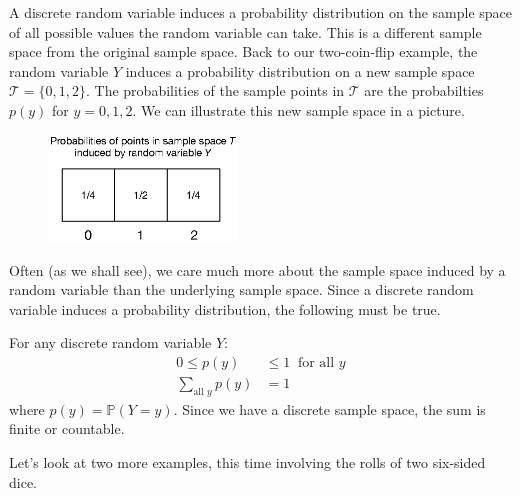 \documentclass[12pt]{article}
\theoremstyle{definition}
\theoremstyle{remark}
\def\P{{\mathbb P}}
\begin{document}
A discrete random variable induces a probability distribution on the sample space of all possible values the random variable can take. This is a different sample space from the original sample space. Back to our two-coin-flip example, the random variable $Y$ induces a probability distribution on a new sample space $\mathcal{T} = \{0, 1, 2\}$. The probabilities of the sample points in $\mathcal{T}$ are the probabilties $p(y)$ for $y = 0, 1, 2$. We can illustrate this new sample space in a picture.

\begin{figure}[H]
\centering
\includegraphics[width=5cm]{induced1.eps}
\end{figure}

Often (as we shall see), we care much more about the sample space induced by a random variable than the underlying sample space. Since a discrete random variable induces a probability distribution, the following must be true.

\begin{framed}
For any discrete random variable $Y$:
\begin{align*}
0 \leq p(y) &\leq 1 \:\text{ for all }y \\
\sum_{\text{all } y} p(y) &= 1
\end{align*}
where $p(y) = \P(Y = y)$. Since we have a discrete sample space, the sum is finite or countable.
\end{framed}

Let's look at two more examples, this time involving the rolls of two six-sided dice.
\end{document}
